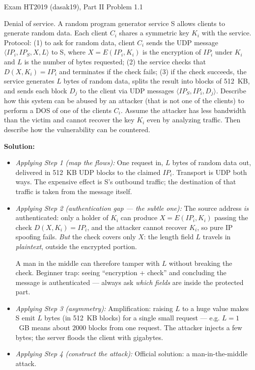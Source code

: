\documentclass[12pt, a4paper]{article}
\begin{document}
\begin{practicebox}{Exam HT2019 (dasak19), Part II Problem 1.1}
\begin{problembox}
Denial of service. A random program generator service S allows clients to generate random data. Each client $C_i$ shares a symmetric key $K_i$ with the service. Protocol: (1) to ask for random data, client $C_i$ sends the UDP message $\langle IP_i, IP_S, X, L \rangle$ to S, where $X = E(IP_i, K_i)$ is the encryption of $IP_i$ under $K_i$ and $L$ is the number of bytes requested; (2) the service checks that $D(X, K_i) = IP_i$ and terminates if the check fails; (3) if the check succeeds, the service generates $L$ bytes of random data, splits the result into blocks of 512~KB, and sends each block $D_j$ to the client via UDP messages $\langle IP_S, IP_i, D_j \rangle$. Describe how this system can be abused by an attacker (that is not one of the clients) to perform a DOS of one of the clients $C_i$. Assume the attacker has less bandwidth than the victim and cannot recover the key $K_i$ even by analyzing traffic. Then describe how the vulnerability can be countered.
\end{problembox}

\textbf{Solution:}
\begin{itemize}
    \item \textit{Applying Step 1 (map the flows):} One request in, $L$ bytes of random data out, delivered in 512~KB UDP blocks to the claimed $IP_i$. Transport is UDP both ways. The expensive effect is S's outbound traffic; the destination of that traffic is taken from the message itself.
    \item \textit{Applying Step 2 (authentication gap --- the subtle one):} The source address \emph{is} authenticated: only a holder of $K_i$ can produce $X = E(IP_i, K_i)$ passing the check $D(X, K_i) = IP_i$, and the attacker cannot recover $K_i$, so pure IP spoofing fails. \emph{But} the check covers only $X$: the length field $L$ travels in \emph{plaintext}, outside the encrypted portion.

    A man in the middle can therefore tamper with $L$ without breaking the check. Beginner trap: seeing ``encryption + check'' and concluding the message is authenticated --- always ask \emph{which fields} are inside the protected part.
    \item \textit{Applying Step 3 (asymmetry):} Amplification: raising $L$ to a huge value makes S emit $L$ bytes (in 512~KB blocks) for a single small request --- e.g. $L = 1$~GB means about $2000$ blocks from one request. The attacker injects a few bytes; the server floods the client with gigabytes.
    \item \textit{Applying Step 4 (construct the attack):} Official solution: a man-in-the-middle attack.


\end{itemize}
\end{practicebox}
\end{document}

